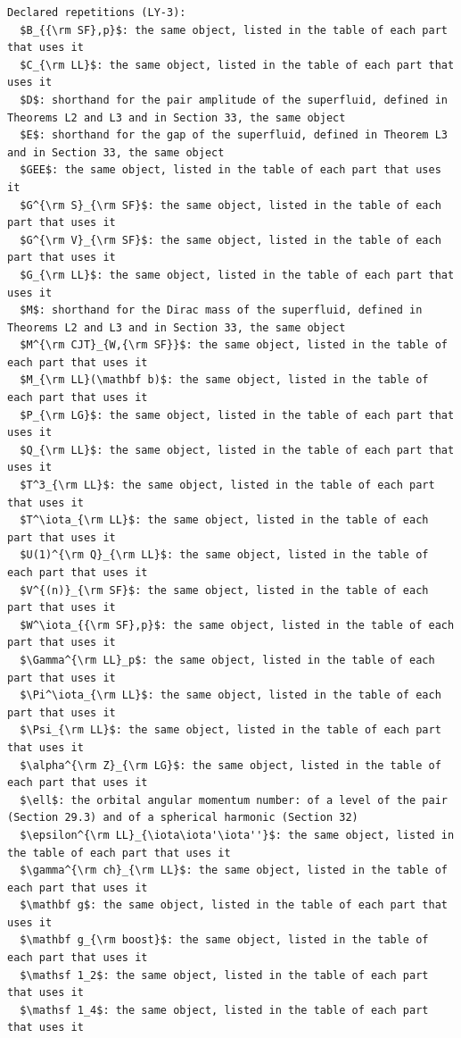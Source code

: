 \documentclass[
  10pt,
]{article}
\begin{document}
\begin{verbatim}
Declared repetitions (LY-3):
  $B_{{\rm SF},p}$: the same object, listed in the table of each part that uses it
  $C_{\rm LL}$: the same object, listed in the table of each part that uses it
  $D$: shorthand for the pair amplitude of the superfluid, defined in Theorems L2 and L3 and in Section 33, the same object
  $E$: shorthand for the gap of the superfluid, defined in Theorem L3 and in Section 33, the same object
  $GEE$: the same object, listed in the table of each part that uses it
  $G^{\rm S}_{\rm SF}$: the same object, listed in the table of each part that uses it
  $G^{\rm V}_{\rm SF}$: the same object, listed in the table of each part that uses it
  $G_{\rm LL}$: the same object, listed in the table of each part that uses it
  $M$: shorthand for the Dirac mass of the superfluid, defined in Theorems L2 and L3 and in Section 33, the same object
  $M^{\rm CJT}_{W,{\rm SF}}$: the same object, listed in the table of each part that uses it
  $M_{\rm LL}(\mathbf b)$: the same object, listed in the table of each part that uses it
  $P_{\rm LG}$: the same object, listed in the table of each part that uses it
  $Q_{\rm LL}$: the same object, listed in the table of each part that uses it
  $T^3_{\rm LL}$: the same object, listed in the table of each part that uses it
  $T^\iota_{\rm LL}$: the same object, listed in the table of each part that uses it
  $U(1)^{\rm Q}_{\rm LL}$: the same object, listed in the table of each part that uses it
  $V^{(n)}_{\rm SF}$: the same object, listed in the table of each part that uses it
  $W^\iota_{{\rm SF},p}$: the same object, listed in the table of each part that uses it
  $\Gamma^{\rm LL}_p$: the same object, listed in the table of each part that uses it
  $\Pi^\iota_{\rm LL}$: the same object, listed in the table of each part that uses it
  $\Psi_{\rm LL}$: the same object, listed in the table of each part that uses it
  $\alpha^{\rm Z}_{\rm LG}$: the same object, listed in the table of each part that uses it
  $\ell$: the orbital angular momentum number: of a level of the pair (Section 29.3) and of a spherical harmonic (Section 32)
  $\epsilon^{\rm LL}_{\iota\iota'\iota''}$: the same object, listed in the table of each part that uses it
  $\gamma^{\rm ch}_{\rm LL}$: the same object, listed in the table of each part that uses it
  $\mathbf g$: the same object, listed in the table of each part that uses it
  $\mathbf g_{\rm boost}$: the same object, listed in the table of each part that uses it
  $\mathsf 1_2$: the same object, listed in the table of each part that uses it
  $\mathsf 1_4$: the same object, listed in the table of each part that uses it

\end{verbatim}
\end{document}
